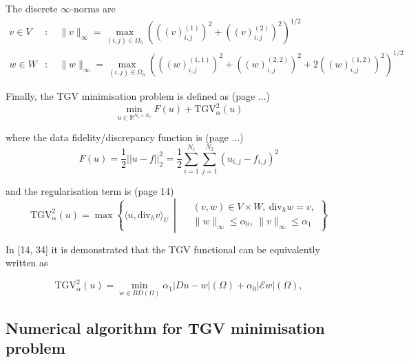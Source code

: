 \documentclass{article}
\begin{document}
The discrete $\infty\text{-norms}$ are
\begin{equation}
    \begin{aligned}
    v \in V &: \quad \|v\|_\infty = \max_{(i,j) \in \Omega_h} \left( \left( (v)_{i,j}^{(1)} \right)^{2} + \left( (v)_{i,j}^{(2)} \right)^{2} \right)^{1/2} \\
    w \in W &: \quad \|w\|_\infty = \max_{(i,j) \in \Omega_h} \left( \left( (w)_{i,j}^{(1,1)} \right)^{2} + \left( (w)_{i,j}^{(2,2)} \right)^{2} + 2 \left( (w)_{i,j}^{(1,2)} \right)^{2} \right)^{1/2}
\end{aligned}
\end{equation}


Finally, the TGV minimisation problem
is defined as (page ...)
\begin{equation}
    \min_{u \in \mathbb{R}^{N_1 \times N_2}} F(u) + \mathrm{TGV}^2_\alpha(u)
    \label{eq:tgv_minimisation_problem}
\end{equation}

where
the data fidelity/discrepancy function is (page ...)
\begin{equation}
    F(u) = \frac{1}{2} || u - f ||^2_2 = 
    \frac{1}{2}
    \sum_{i=1}^{N_1} \sum_{j=1}^{N_2} (u_{i,j} - f_{i,j})^2
\end{equation}

and
the regularisation term is (page 14)
\begin{equation}
    \mathrm{TGV}^2_\alpha(u) = \max \left\{ \langle u, \mathrm{div}_h v \rangle_U \ \middle| \ 
    \begin{aligned}
    &(v, w) \in V \times W, \ \mathrm{div}_h w = v, \\
    &\|w\|_\infty \leq \alpha_0, \ \|v\|_\infty \leq \alpha_1 
    \end{aligned}
    \right\}
\end{equation}

In [14, 34] it is demonstrated that the TGV functional can be equivalently written as

\begin{equation}
    \text{TGV}^2_{\alpha}(u) = \min_{w \in BD(\Omega)} \alpha_1 \lvert Du - w \rvert (\Omega) + \alpha_0 \lvert \mathcal{E} w \rvert (\Omega),
\end{equation}
    




\subsection{
Numerical
algorithm for TGV minimisation problem
}
\end{document}
